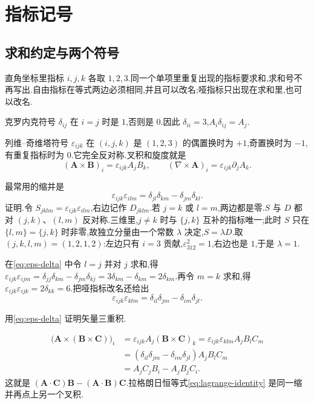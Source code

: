 \section{指标记号}

\subsection{求和约定与两个符号}
直角坐标里指标 $i,j,k$ 各取 $1,2,3$.同一个单项里重复出现的指标要求和,求和号不再写出.自由指标在等式两边必须相同,并且可以改名;哑指标只出现在求和里,也可以改名.

克罗内克符号 $\delta_{ij}$ 在 $i=j$ 时是 $1$,否则是 $0$.因此 $\delta_{ii}=3$,$A_i\delta_{ij}=A_j$.

列维--奇维塔符号 $\varepsilon_{ijk}$ 在 $(i,j,k)$ 是 $(1,2,3)$ 的偶置换时为 $+1$,奇置换时为 $-1$,有重复指标时为 $0$.它完全反对称.叉积和旋度就是
\begin{equation}
  (\mathbf{A}\times\mathbf{B})_i=\varepsilon_{ijk}A_j B_k,
  \qquad
  (\nabla\times\mathbf{A})_i=\varepsilon_{ijk}\partial_j A_k.
\end{equation}

最常用的缩并是
\begin{equation}
  \varepsilon_{ijk}\varepsilon_{ilm}
  =\delta_{jl}\delta_{km}-\delta_{jm}\delta_{kl}.
  \label{eq:eps-delta}
\end{equation}
证明.令 $S_{jklm}=\varepsilon_{ijk}\varepsilon_{ilm}$,右边记作 $D_{jklm}$.若 $j=k$ 或 $l=m$,两边都是零.$S$ 与 $D$ 都对 $(j,k)$、$(l,m)$ 反对称.三维里,$j\neq k$ 时与 $\{j,k\}$ 互补的指标唯一;此时 $S$ 只在 $\{l,m\}=\{j,k\}$ 时非零,故独立分量由一个常数 $\lambda$ 决定,$S=\lambda D$.取 $(j,k,l,m)=(1,2,1,2)$:左边只有 $i=3$ 贡献,$\varepsilon_{312}^2=1$,右边也是 $1$,于是 $\lambda=1$.

在\eqref{eq:eps-delta} 中令 $l=j$ 并对 $j$ 求和,得 $\varepsilon_{ijk}\varepsilon_{ijm}=\delta_{jj}\delta_{km}-\delta_{jm}\delta_{kj}=3\delta_{km}-\delta_{km}=2\delta_{km}$.再令 $m=k$ 求和,得 $\varepsilon_{ijk}\varepsilon_{ijk}=2\delta_{kk}=6$.把哑指标改名还给出
\begin{equation}
  \varepsilon_{ijk}\varepsilon_{klm}
  =\delta_{il}\delta_{jm}-\delta_{im}\delta_{jl}.
\end{equation}

\begin{example}
用\eqref{eq:eps-delta} 证明矢量三重积.
\end{example}
\begin{solution}
\begin{align}
  \bigl(\mathbf{A}\times(\mathbf{B}\times\mathbf{C})\bigr)_i
  &=\varepsilon_{ijk}A_j(\mathbf{B}\times\mathbf{C})_k
   =\varepsilon_{ijk}\varepsilon_{klm}A_j B_l C_m \\
  &=(\delta_{il}\delta_{jm}-\delta_{im}\delta_{jl})A_j B_l C_m \\
  &=A_j C_j B_i-A_j B_j C_i.
\end{align}
这就是 $(\mathbf{A}\cdot\mathbf{C})\mathbf{B}-(\mathbf{A}\cdot\mathbf{B})\mathbf{C}$.拉格朗日恒等式\eqref{eq:lagrange-identity} 是同一缩并再点上另一个叉积.
\end{solution}


